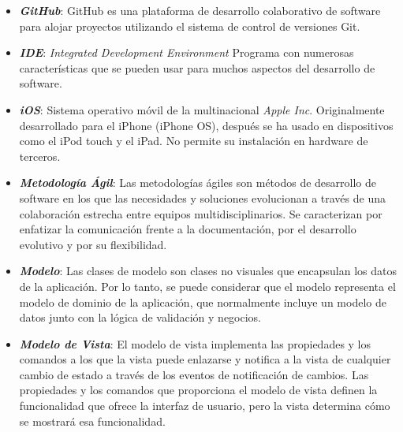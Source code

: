 \begin{itemize}
    \item \textbf{\textit{GitHub}}: GitHub es una plataforma de desarrollo 
    colaborativo de software para alojar proyectos utilizando el sistema de 
    control de versiones Git.

    \item \textbf{\textit{IDE}}: \emph{Integrated Development Environment} 
    Programa con numerosas características que se pueden usar para muchos 
    aspectos del desarrollo de software.

    \item \textbf{\textit{iOS}}: Sistema operativo móvil de la multinacional
    \emph{Apple Inc}. Originalmente desarrollado para el iPhone (iPhone OS), 
    después se ha usado en dispositivos como el iPod touch y el iPad. 
    No permite su instalación en hardware de terceros.
    
    \item \textbf{\textit{Metodología Ágil}}: Las metodologías ágiles son 
    métodos de desarrollo de software en los que las necesidades y soluciones 
    evolucionan a través de una colaboración estrecha entre equipos 
    multidisciplinarios. Se caracterizan por enfatizar la comunicación 
    frente a la documentación, por el desarrollo evolutivo y por su 
    flexibilidad.
    
    \item \textbf{\textit{Modelo}}: Las clases de modelo son clases no 
    visuales que encapsulan los datos de la aplicación. Por lo tanto, se 
    puede considerar que el modelo representa el modelo de dominio de la 
    aplicación, que normalmente incluye un modelo de datos junto con la 
    lógica de validación y negocios. 

    \item \textbf{\textit{Modelo de Vista}}: El modelo de vista implementa las 
    propiedades y los comandos a los que la vista puede enlazarse y notifica 
    a la vista de cualquier cambio de estado a través de los eventos de 
    notificación de cambios. Las propiedades y los comandos que proporciona 
    el modelo de vista definen la funcionalidad que ofrece la interfaz de 
    usuario, pero la vista determina cómo se mostrará esa funcionalidad.
    

\end{itemize}
